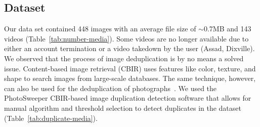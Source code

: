 \documentclass{acm_proc_article-sp}
\begin{document}
\subsection{Dataset}
Our data set contained 448 images with an average file size of $\sim$0.7MB and 143 videos (Table~\ref{tab:number-media}). Some videos are no longer available due to either an account termination or a video takedown by the user (Assad, Dixville). We observed that the process of image deduplication is by no means a solved issue. Content-based image retrieval (CBIR) uses features like color, texture, and shape to search images from large-scale databases. The same technique, however, can also be used for the deduplication of photographs~\cite{Pattabhi:RAICS11}. We used the PhotoSweeper CBIR-based image duplication detection software that allows for manual algorithm and threshold selection to detect duplicates in the dataset (Table~\ref{tab:duplicate-media}). \begin{table}[htbp]
\end{table}
\end{document}
